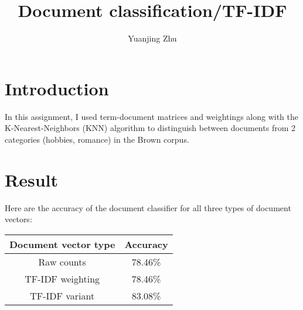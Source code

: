 \documentclass{article}
\title{Document classification/TF-IDF}
\author{Yuanjing Zhu}
\begin{document}
\maketitle

\section{Introduction}

In this assignment, I used term-document matrices and weightings along with the K-Nearest-Neighbors (KNN) algorithm to distinguish between documents from 2 categories (hobbies, romance) in the Brown corpus. 


\section{Result}

Here are the accuracy of the document classifier for all three types of document vectors:
\newline

\begin{tabular}{c|c}
\centering
Document vector type & Accuracy \\\hline
Raw counts & 78.46\% \\
TF-IDF weighting & 78.46\% \\
TF-IDF variant & 83.08\% \\\hline
\end{tabular}
\newline
\end{document}
